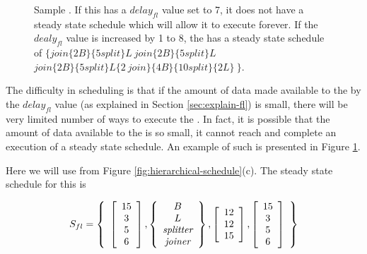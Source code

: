 \begin{figure}
\centering
{}
\caption[Example of non-shedulable {\feedbackloop}]{Sample
{\feedbackloop}. If this {\feedbackloop} has a $delay_{fl}$ value
set to 7, it does not have a steady state schedule which will
allow it to execute forever. If the $dealy_{fl}$ value is
increased by 1 to 8, the {\feedbackloop} has a steady state
schedule of $\{join\{2B\}\{5 split\}L\ join\{2B\}\{5 split\}L\ $
$join\{2B\}\{5 split\}L\{2\ join\}\{4B\}\{10 split\}\{2L\}\ \}$.}
\label{fig:feedback-non-schedulable}
\end{figure}

The difficulty in scheduling {\feedbackloops} is that if the amount
of data made available to the {\feedbackloop} by the $delay_{fl}$
value (as explained in Section \ref{sec:explain-fl}) is small,
there will be very limited number of ways to execute the
{\feedbackloop}.  In fact, it is possible that the amount of data
available to the {\feedbackloop} is so small, it cannot reach and
complete an execution of a steady state schedule. An example of
such {\feedbackloop} is presented in Figure
\ref{fig:feedback-non-schedulable}.

Here we will use {\feedbackloop} from Figure
\ref{fig:hierarchical-schedule}(c).  The steady state schedule for
this {\feedbackloop} is

\begin{displaymath} S_{fl} = \left\{
\begin{array}{c} \left[
\begin{array}{c}
15 \\ 3 \\ 5 \\ 6 \end{array}\right], \left\{
\begin{array}{c} B \\ L \\ {\emph{splitter}} \\ {\emph{joiner}} \end{array}\right\}, \left[
\begin{array}{c}
12 \\ 12 \\ 15
\end{array}
\right], \left[
\begin{array}{c}
15 \\ 3 \\ 5 \\ 6
\end{array}\right]
\end{array} \right\}
\end{displaymath}

